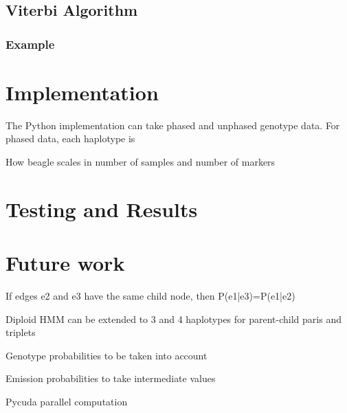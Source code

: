 \documentclass[a4paper,11pt,twoside,abstraction,titlepage]{article}
\begin{document}
\subsection{Viterbi Algorithm}

\subsubsection{Example}

\newpage
\section{Implementation}
The Python implementation can take phased and unphased genotype data.  For phased data, each haplotype is 

How beagle scales in number of samples and number of markers

\newpage
\section{Testing and Results}


\newpage
\section{Future work}
If edges e2 and e3 have the same child node, then P(e1|e3)=P(e1|e2)

Diploid HMM can be extended to 3 and 4 haplotypes for parent-child paris and triplets

Genotype probabilities to be taken into account

Emission probabilities to take intermediate values

Pycuda parallel computation

\newpage
\end{document}
